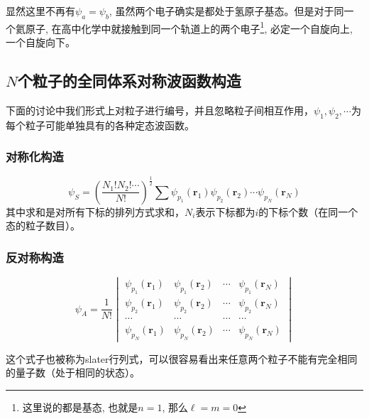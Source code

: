 \documentclass[a4paper,zihao=-4,linespread=1]{ctexrep}
\begin{document}
    显然这里不再有$\psi_a=\psi_b$, 虽然两个电子确实是都处于氢原子基态。但是对于同一个氦原子, 在高中化学中就接触到同一个轨道上的两个电子\footnote{这里说的都是基态, 也就是$n=1$, 那么$\ell=m=0$}, 必定一个自旋向上, 一个自旋向下。
    \subsection{$N$个粒子的全同体系对称波函数构造}
    	下面的讨论中我们形式上对粒子进行编号，并且忽略粒子间相互作用，$\psi_1,\psi_2,\cdots$为每个粒子可能单独具有的各种定态波函数。
    	\subsubsection{对称化构造}
    	\begin{equation}
    		\psi_S=\left(\frac{N_1!N_2!\cdots}{N!}\right)^{\frac{1}{2}}\sum\psi_{p_1}(\mathbf{r}_1)\psi_{p_2}(\mathbf{r}_2)\cdots\psi_{p_N}(\mathbf{r}_N)
    	\end{equation}
    	其中求和是对所有下标的排列方式求和，$N_i$表示下标都为$i$的下标个数（在同一个态的粒子数目）。
    	\subsubsection{反对称构造}
    	\begin{equation}
	    		\psi_A=\frac{1}{N!}\begin{vmatrix}
	    			\psi_{p_1}(\mathbf{r}_1)&\psi_{p_1}(\mathbf{r}_2)&\cdots&\psi_{p_1}(\mathbf{r}_N) \\
	    			\psi_{p_2}(\mathbf{r}_1)&\psi_{p_2}(\mathbf{r}_2)&\cdots&\psi_{p_2}(\mathbf{r}_N) \\
	    			\cdots&\cdots&\cdots&\cdots\\
	    			\psi_{p_N}(\mathbf{r}_1)&\psi_{p_N}(\mathbf{r}_2)&\cdots&\psi_{p_N}(\mathbf{r}_N) 
	    		\end{vmatrix} 
    	\end{equation}
    
    	这个式子也被称为slater行列式，可以很容易看出来任意两个粒子不能有完全相同的量子数（处于相同的状态）。
\end{document}
